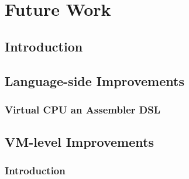 
\chapter{Future Work}
\minitoc

\section{Introduction}

\section{Language-side Improvements}



\subsection{Virtual CPU an Assembler DSL}



\section{VM-level Improvements}


\subsection{Introduction}

